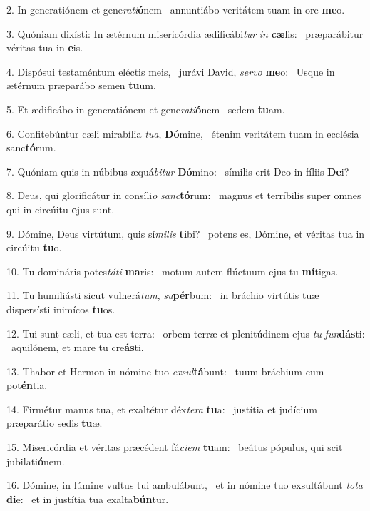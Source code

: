 2. In generatiónem et gene\textit{ra}\textit{ti}\textbf{ó}nem \ast\  annuntiábo veritátem tuam in ore \textbf{me}o.\

3. Quóniam dixísti: In ætérnum misericórdia ædificábi\textit{tur} \textit{in} \textbf{cæ}lis: \ast\  præparábitur véritas tua in \textbf{e}is.\

4. Dispósui testaméntum eléctis meis, \dag\  jurávi David, \textit{ser}\textit{vo} \textbf{me}o: \ast\  Usque in ætérnum præparábo semen \textbf{tu}um.\

5. Et ædificábo in generatiónem et gene\textit{ra}\textit{ti}\textbf{ó}nem \ast\  sedem \textbf{tu}am.\

6. Confitebúntur cæli mirabília \textit{tu}\textit{a}, \textbf{Dó}mine, \ast\  étenim veritátem tuam in ecclésia sanc\textbf{tó}rum.\

7. Quóniam quis in núbibus æquá\textit{bi}\textit{tur} \textbf{Dó}mino: \ast\  símilis erit Deo in fíliis \textbf{De}i?\

8. Deus, qui glorificátur in consíli\textit{o} \textit{sanc}\textbf{tó}rum: \ast\  magnus et terríbilis super omnes qui in circúitu \textbf{e}jus sunt.\

9. Dómine, Deus virtútum, quis sí\textit{mi}\textit{lis} \textbf{ti}bi? \ast\  potens es, Dómine, et véritas tua in circúitu \textbf{tu}o.\

10. Tu domináris potes\textit{tá}\textit{ti} \textbf{ma}ris: \ast\  motum autem flúctuum ejus tu \textbf{mí}tigas.\

11. Tu humiliásti sicut vulnerá\textit{tum}, \textit{su}\textbf{pér}bum: \ast\  in bráchio virtútis tuæ dispersísti inimícos \textbf{tu}os.\

12. Tui sunt cæli, et tua est terra: \dag\  orbem terræ et plenitúdinem ejus \textit{tu} \textit{fun}\textbf{dás}ti: \ast\  aquilónem, et mare tu cre\textbf{ás}ti.\

13. Thabor et Hermon in nómine tuo \textit{ex}\textit{sul}\textbf{tá}bunt: \ast\  tuum bráchium cum pot\textbf{én}tia.\

14. Firmétur manus tua, et exaltétur déx\textit{te}\textit{ra} \textbf{tu}a: \ast\  justítia et judícium præparátio sedis \textbf{tu}æ.\

15. Misericórdia et véritas præcédent fá\textit{ci}\textit{em} \textbf{tu}am: \ast\  beátus pópulus, qui scit jubilati\textbf{ó}nem.\

16. Dómine, in lúmine vultus tui ambulábunt, \dag\  et in nómine tuo exsultábunt \textit{to}\textit{ta} \textbf{di}e: \ast\  et in justítia tua exalta\textbf{bún}tur.\

